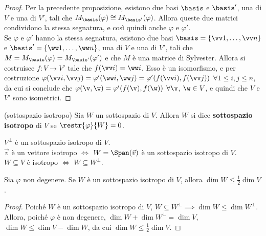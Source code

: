 \begin{proof}\nl\nl
	\rightproof Per la precedente proposizione, esistono due basi $\basis$ e $\basis'$, una di $V$ e una di $V'$,
	tali che $M_\basis(\varphi) \cong M_{\basis'}(\varphi)$. Allora queste due matrici condividono la stessa
	segnatura, e così quindi anche $\varphi$ e $\varphi'$. \\
	
	\leftproof Se $\varphi$ e $\varphi'$ hanno la stessa segnatura, esistono due basi $\basis = \{ \vv 1, \ldots, \vv n \}$ e $\basis' = \{ \ww 1, \ldots, \ww n \}$, una
	di $V$ e una di $V'$, tali che $M = M_\basis(\varphi) = M_{\basis'}(\varphi')$ e che $M$ è una matrice di
	Sylvester. Allora si costruisce $f : V \to V'$ tale che $f(\vv i) = \ww i$. Esso è un isomorfismo, e per
	costruzione $\varphi(\vv i, \vv j) = \varphi'(\ww i, \ww j) = \varphi'(f(\vv i), f(\vv j))$ $\forall 1 \leq i, j \leq n$, da cui
	si conclude che $\varphi(\v, \w) = \varphi'(f(\v), f(\w))$ $\forall \v$, $\w \in V$, e quindi che $V$ e
	$V'$ sono isometrici.
\end{proof}


\begin{definition} (sottospazio isotropo)
	Sia $W$ un sottospazio di $V$. Allora $W$ si dice \textbf{sottospazio isotropo} di $V$
	se $\restr{\varphi}{W} = 0$.
\end{definition}

\begin{remark}\nl
	\li $V^\perp$ è un sottospazio isotropo di $V$. \\
	\li $\vec{v}$ è un vettore isotropo $\iff$ $W = \Span(\vec v)$ è un sottospazio isotropo di $V$. \\
	\li $W \subseteq V$ è isotropo $\iff$ $W \subseteq W^\perp$.
\end{remark}

\begin{proposition}
	Sia $\varphi$ non degenere. Se $W$ è un sottospazio isotropo di $V$, allora
	$\dim W \leq \frac{1}{2} \dim V$.
\end{proposition}

\begin{proof}
	Poiché $W$ è un sottospazio isotropo di $V$, $W \subseteq W^\perp \implies \dim W \leq \dim W^\perp$.
	Allora, poiché $\varphi$ è non degenere, $\dim W + \dim W^\perp = \dim V$, $\dim W \leq \dim V - \dim W$,
	da cui $\dim W \leq \frac{1}{2} \dim V$.
\end{proof}

